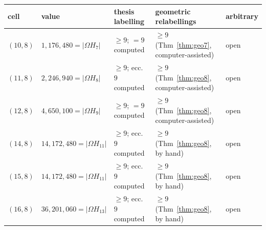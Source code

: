 \documentclass[11pt]{amsart}
\theoremstyle{plain}
\theoremstyle{definition}
\theoremstyle{remark}
\newcommand{\Om}{\Omega}
\begin{document}
\begin{center}\small
\begin{tabular}{@{}lllll@{}}
\toprule
cell & value & thesis labelling & geometric relabellings & arbitrary\\
\midrule
$(10,8)$ & $1{,}176{,}480 = |\Om H_7|$ & $\ge 9$; $= 9$ computed & $\ge 9$ (Thm~\ref{thm:geo7}, computer-assisted) & open\\
$(11,8)$ & $2{,}246{,}940 = |\Om H_8|$ & $\ge 9$; ecc.\ $9$ computed & $\ge 9$ (Thm~\ref{thm:geo8}, computer-assisted) & open\\
$(12,8)$ & $4{,}650{,}100 = |\Om H_9|$ & $\ge 9$; $= 9$ computed & $\ge 9$ (Thm~\ref{thm:geo8}, computer-assisted) & open\\
$(14,8)$ & $14{,}172{,}480 = |\Om H_{11}|$ & $\ge 9$; ecc.\ $9$ computed & $\ge 9$ (Thm~\ref{thm:geo8}, by hand) & open\\
$(15,8)$ & $14{,}172{,}480 = |\Om H_{11}|$ & $\ge 9$; ecc.\ $9$ computed & $\ge 9$ (Thm~\ref{thm:geo8}, by hand) & open\\
$(16,8)$ & $36{,}201{,}060 = |\Om H_{13}|$ & $\ge 9$; ecc.\ $9$ computed & $\ge 9$ (Thm~\ref{thm:geo8}, by hand) & open\\
\bottomrule
\end{tabular}

\smallskip{}
\end{center}
\end{document}
